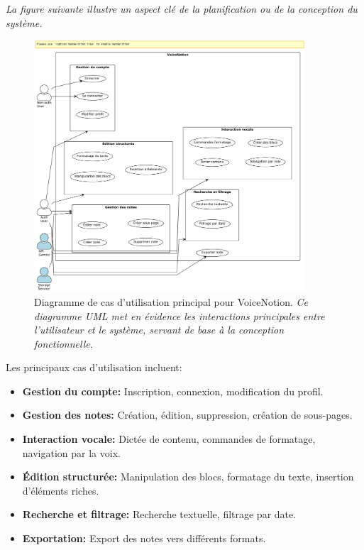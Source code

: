 \noindent
\textit{La figure suivante illustre un aspect clé de la planification ou de la conception du système.}
\begin{figure}[H]
    \centering
    \includegraphics[width=0.9\textwidth]{assets/docs/voicenotion_use_case.png}
    \caption{Diagramme de cas d'utilisation principal pour VoiceNotion. \newline\textit{Ce diagramme UML met en évidence les interactions principales entre l'utilisateur et le système, servant de base à la conception fonctionnelle.}}
    \label{fig:use_case_diagram}
\end{figure}

Les principaux cas d'utilisation incluent:

\begin{itemize}
    \item \textbf{Gestion du compte:} Inscription, connexion, modification du profil.
    
    \item \textbf{Gestion des notes:} Création, édition, suppression, création de sous-pages.
    
    \item \textbf{Interaction vocale:} Dictée de contenu, commandes de formatage, navigation par la voix.
    
    \item \textbf{Édition structurée:} Manipulation des blocs, formatage du texte, insertion d'éléments riches.
    
    \item \textbf{Recherche et filtrage:} Recherche textuelle, filtrage par date.
    
    \item \textbf{Exportation:} Export des notes vers différents formats.
\end{itemize}

